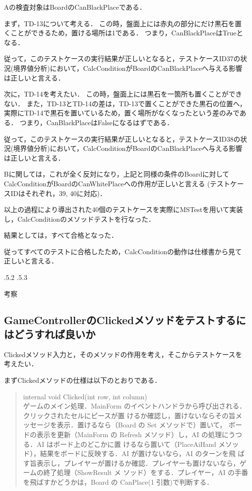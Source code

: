 \documentclass[platex,dvipdfmx,12pt]{jsarticle}
\makeatletter
\renewcommand{\section}{%
\clearpage
\@startsection{section}{1}{\z@}%
{\Cvs \@plus.5\Cdp \@minus.2\Cdp}%
{.5\Cvs \@plus.3\Cdp}%
{\normalfont\LARGE\headfont\raggedright}}%
\makeatother
\begin{document}
Aの検査対象はBoardのCanBlackPlaceである．

まず，TD-13について考える．
この時，盤面上には赤丸の部分にだけ黒石を置くことができるため，置ける場所は1である．
つまり，CanBlackPlaceはTrueとなる．

従って，このテストケースの実行結果が正しいとなると，テストケースID37の状況(境界値分析)において，CalcConditionがBoardのCanBlackPlaceへ与える影響は正しいと言える．

次に，TD-14を考えたい．
この時，盤面上には黒石を一箇所も置くことができない．
また，TD-13とTD-14の差は，TD-13で置くことができた黒石の位置へ，実際にTD-14で黒石を置いているため，置く場所がなくなったという差のみである．
つまり，CanBlackPlaceはFalseになるはずである．

従って，このテストケースの実行結果が正しいとなると，テストケースID38の状況(境界値分析)において，CalcConditionがBoardのCanBlackPlaceへ与える影響は正しいと言える．

Bに関しては，これが全く反対になり，上記と同様の条件のBoardに対してCalcConditionがBoardのCanWhitePlaceへの作用が正しいと言える
(テストケースIDはそれぞれ，39, 40に対応)．


以上の過程により導出された40個のテストケースを実際にMSTestを用いて実装し，CalcConditionのメソッドテストを行なった．

結果としては，すべて合格となった．

従ってすべてのテストに合格したため，CalcConditionの動作は仕様書から見て正しいと言える．



\section{考察}
\subsection{GameControllerのClickedメソッドをテストするにはどうすれば良いか}
Clickedメソッド入力と，そのメソッドの作用を考え，そこからテストケースを考えたい．

まずClickedメソッドの仕様\cite{journal:sekkeisyo}は以下のとおりである．

\begin{quote}
internal void Clicked(int row, int column) \\

ゲームのメイン処理．MainForm のイベントハンドラから呼び出される．クリックされたセルにピースが置
けるか確認し，置けないならその旨メッセージを表示．置けるなら（Board の Set メソッドで）置いて，
ボードの表示を更新（MainForm の Refresh メソッド）し，AI の処理にうつる．AI はボード上のどこかに置
けるなら置いて（PlaceAiHand メソッド），結果をボードに反映する．AI が置けないなら，AI のターンを飛
ばす旨表示し，プレイヤーが置けるか確認．プレイヤーも置けないなら，ゲームの終了処理（ShowResult メ
ソッド）をする．プレイヤー，AI の手番を飛ばすかどうかは，Board の CanPlace(1 引数)で判断する．
\end{quote}
\end{document}
